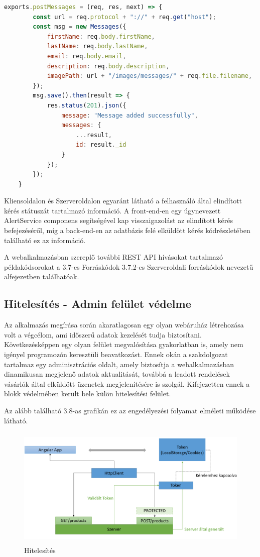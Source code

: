 \begin{lstlisting}[language=JavaScript]
	exports.postMessages = (req, res, next) => {
		const url = req.protocol + "://" + req.get("host");
		const msg = new Messages({
			firstName: req.body.firstName,
			lastName: req.body.lastName,
			email: req.body.email,
			description: req.body.description,
			imagePath: url + "/images/messages/" + req.file.filename,
		});
		msg.save().then(result => {
			res.status(201).json({
				message: "Message added successfully",
				messages: {
					...result,
					id: result._id
				}
			});
		});
	}
\end{lstlisting}

Kliensoldalon és Szerveroldalon egyaránt látható a felhasználó által elindított kérés státuszát tartalmazó információ. A front-end-en egy úgynevezett AlertService componens segítségével kap visszaigazolást az elindított kérés befejezéséről, míg a back-end-en az adatbázis felé elküldött kérés kódrészletében található ez az információ.

\bigskip
A webalkalmazásban szereplő további REST API hívásokat tartalmazó példakódsorokat a 3.7-es Forráskódok 3.7.2-es Szerveroldali forráskódok nevezetű alfejezetben találhatóak.

\subsection{Hitelesítés - Admin felület védelme}
Az alkalmazás megírása során akaratlagosan egy olyan webáruház létrehozása volt a végcélom, ami időszerű adatok kezelését tudja biztosítani. Következésképpen egy olyan felület megvalósítása gyakorlatban is, amely nem igényel programozón keresztüli beavatkozást. Ennek okán a szakdolgozat tartalmaz egy adminisztrációs oldalt, amely biztosítja a webalkalmazásban dinamikusan megjelenő adatok aktualitását, továbbá a leadott rendelések vásárlók által elküldött üzenetek megjelenítésére is szolgál. Kifejezetten ennek a blokk védelmében került bele külön hitelesítési felület.

\bigskip
Az alább található 3.8-as grafikán ez az engedélyezési folyamat elméleti működése látható.
 
\begin{figure}[H]
	\centering
	\includegraphics[width=1.0\textwidth,height=220px]{images/hitelesites_bemutatasa.png}
	\caption{Hitelesítés}
	\label{fig.picture-9}
\end{figure}


